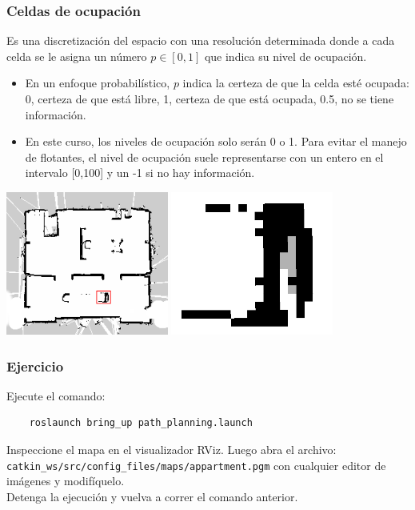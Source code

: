\begin{frame}\frametitle{Celdas de ocupación}
  Es una discretización del espacio con una resolución determinada donde a cada celda se le asigna un número $p\in[0,1]$ que indica su nivel de ocupación.
  \begin{itemize}
  \item En un enfoque probabilístico, $p$ indica la certeza de que la celda esté ocupada: 0, certeza de que está libre, 1, certeza de que está ocupada, 0.5, no se tiene información.
  \item En este curso, los niveles de ocupación solo serán 0 o 1.
 Para evitar el manejo de flotantes, el nivel de ocupación suele representarse con un entero en el intervalo [0,100] y un -1 si no hay información. 
  \end{itemize}
  \includegraphics[width=0.4\textwidth]{Figures/OccupancyGrid.png}
  \includegraphics[width=0.4\textwidth]{Figures/OccupancyGridZoom.png}
\end{frame}

\begin{frame}[containsverbatim]\frametitle{Ejercicio}
  Ejecute el comando:
  \begin{lstlisting}
    roslaunch bring_up path_planning.launch
  \end{lstlisting}
  Inspeccione el mapa en el visualizador RViz. Luego abra el archivo:
  \texttt{catkin\_ws/src/config\_files/maps/appartment.pgm}
  con cualquier editor de imágenes y modifíquelo.
  \\Detenga la ejecución y vuelva a correr el comando anterior. 
\end{frame}


